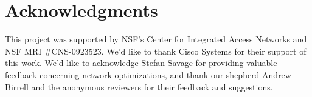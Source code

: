 \section{Acknowledgments}

This project was supported by NSF's Center for Integrated Access Networks and
NSF MRI \#CNS-0923523.  We'd like to thank Cisco Systems for their support of
this work.  We'd like to acknowledge Stefan Savage for providing valuable
feedback concerning network optimizations, and thank our shepherd Andrew
Birrell and the anonymous reviewers for their feedback and suggestions.

